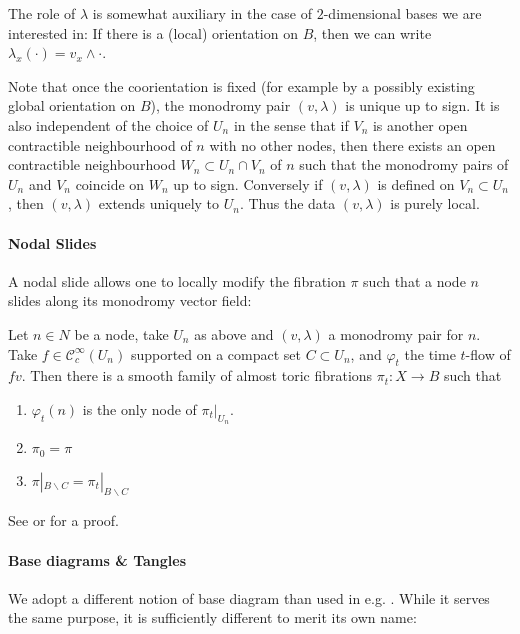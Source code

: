 \documentclass[12pt,a4paper,abstract=true,draft]{scrartcl}
\begin{document}
The role of $λ$ is somewhat auxiliary in the case of $2$-dimensional bases we are interested in: If there is a (local) orientation on $B$, then we can write $λ_x(·) = v_x ∧ ·$.

Note that once the coorientation is fixed (for example by a possibly existing global orientation on $B$), the monodromy pair $(v,λ)$ is unique up to sign.
It is also independent of the choice of $U_n$ in the sense that if $V_n$ is another open contractible neighbourhood of $n$ with no other nodes, then there exists an open contractible neighbourhood $W_n ⊂ U_n ∩ V_n$ of $n$ such that the monodromy pairs of $U_n$ and $V_n$ coincide on $W_n$ up to sign.
Conversely if $(v,λ)$ is defined on $V_n ⊂ U_n$, then $(v,λ)$ extends uniquely to $U_n$.
Thus the data $(v,λ)$ is purely local.

\paragraph{Nodal Slides}
A nodal slide allows one to locally modify the fibration $π$ such that a node $n$ slides along its monodromy vector field:

\begin{lemma}
  \label{thm:nodal_slide}
  Let $n ∈ N$ be a node, take $U_n$ as above and $(v,λ)$ a monodromy pair for $n$.
  Take $f ∈ 𝒞^∞_c(U_n)$ supported on a compact set $C ⊂ U_n$, and $φ_t$ the time $t$-flow of $fv$.
  Then there is a smooth family of almost toric fibrations $π_t \colon X → B$ such that
  \begin{enumerate}
    \item $φ_t(n)$ is the only node of $π_t|_{U_n}$.
    \item $π_0 = π$
    \item $π|_{B ∖ C} = π_t|_{B ∖ C}$
  \end{enumerate}
\end{lemma}

See \cite[Theorem 6.5]{symington2002FourDF} or \cite[Theorem 8.10]{evans2021atfs} for a proof.

\paragraph{Base diagrams \& Tangles}

We adopt a different notion of base diagram than used in e.g. \cite{symington2002FourDF,evans2021atfs}. While it serves the same purpose, it is sufficiently different to merit its own name:
\end{document}
